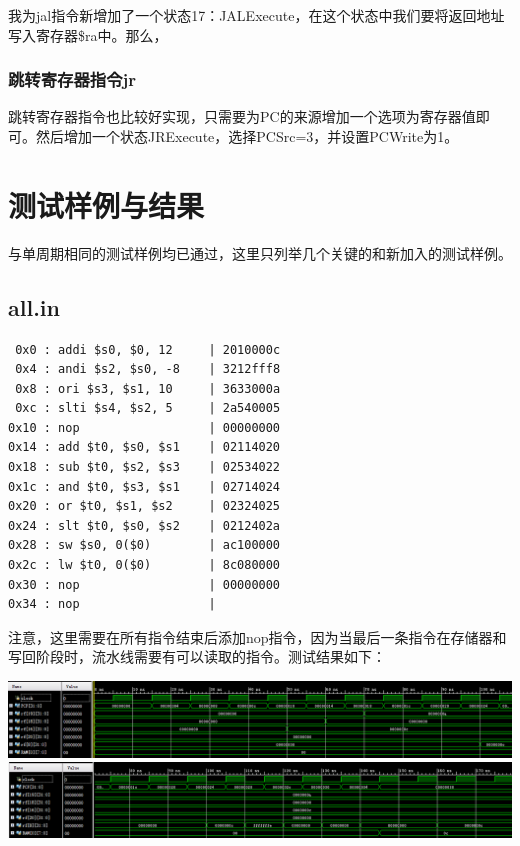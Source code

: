 \documentclass[12pt]{article} %
\begin{document}
\begin{sloppypar}
我为jal指令新增加了一个状态17：JALExecute，在这个状态中我们要将返回地址写入寄存器\$ra中。那么，


\subsubsection{跳转寄存器指令jr}

跳转寄存器指令也比较好实现，只需要为PC的来源增加一个选项为寄存器值即可。然后增加一个状态JRExecute，选择PCSrc=3，并设置PCWrite为1。



\newpage
\section{测试样例与结果}

与单周期相同的测试样例均已通过，这里只列举几个关键的和新加入的测试样例。

\subsection{all.in}

\begin{lstlisting}
 0x0 : addi $s0, $0, 12     | 2010000c
 0x4 : andi $s2, $s0, -8    | 3212fff8
 0x8 : ori $s3, $s1, 10     | 3633000a
 0xc : slti $s4, $s2, 5     | 2a540005
0x10 : nop                  | 00000000
0x14 : add $t0, $s0, $s1    | 02114020
0x18 : sub $t0, $s2, $s3    | 02534022
0x1c : and $t0, $s3, $s1    | 02714024
0x20 : or $t0, $s1, $s2     | 02324025
0x24 : slt $t0, $s0, $s2    | 0212402a
0x28 : sw $s0, 0($0)        | ac100000
0x2c : lw $t0, 0($0)        | 8c080000
0x30 : nop                  | 00000000
0x34 : nop                  | 
\end{lstlisting} 

注意，这里需要在所有指令结束后添加nop指令，因为当最后一条指令在存储器和写回阶段时，流水线需要有可以读取的指令。测试结果如下：

\noindent
\includegraphics[width =\linewidth]{figure/all1.png}
\includegraphics[width =\linewidth]{figure/all2.png}


\end{sloppypar}
\end{document}
